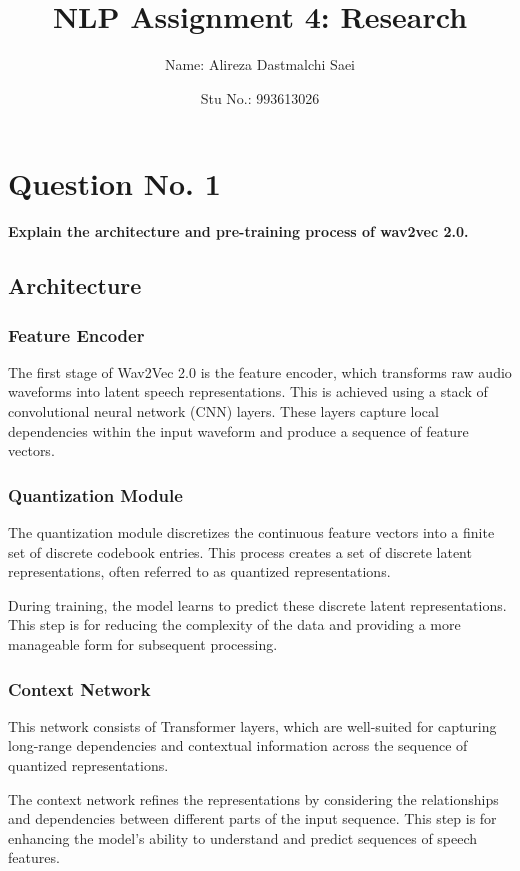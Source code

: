 \documentclass{article}
\title{\textbf{\Huge NLP Assignment 4: Research}}
\author{Name: Alireza Dastmalchi Saei}
\date{Stu No.: 993613026}
\begin{document}
\maketitle

\pagebreak


\section*{Question No. 1}
\textbf{Explain the architecture and pre-training process of wav2vec 2.0.}


\subsection*{Architecture}

\subsubsection{Feature Encoder}

The first stage of Wav2Vec 2.0 is the feature encoder, which transforms raw audio waveforms into latent speech representations. This is achieved using a stack of convolutional neural network (CNN) layers. These layers capture local dependencies within the input waveform and produce a sequence of feature vectors.


\subsubsection{Quantization Module}

The quantization module discretizes the continuous feature vectors into a finite set of discrete codebook entries. This process creates a set of discrete latent representations, often referred to as quantized representations.

During training, the model learns to predict these discrete latent representations. This step is for reducing the complexity of the data and providing a more manageable form for subsequent processing.


\subsubsection{Context Network}

This network consists of Transformer layers, which are well-suited for capturing long-range dependencies and contextual information across the sequence of quantized representations.

The context network refines the representations by considering the relationships and dependencies between different parts of the input sequence. This step is for enhancing the model's ability to understand and predict sequences of speech features.
\end{document}
